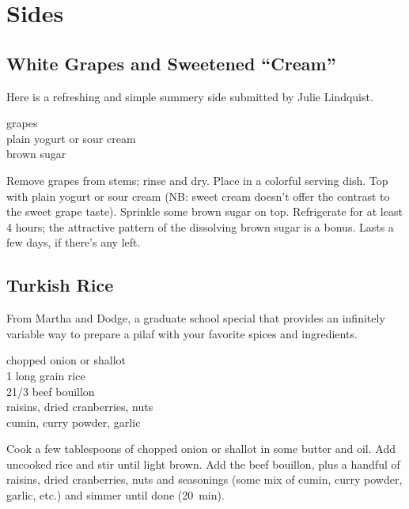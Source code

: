 \chapter{Sides}

\section{White Grapes and Sweetened ``Cream''}

\begin{open}
Here is a refreshing and simple summery side submitted by Julie Lindquist.
\end{open}
\begin{ingredients}
    grapes\\
    plain yogurt or sour cream\\
    brown sugar
\end{ingredients}
Remove grapes from stems; rinse and dry. Place in a colorful serving dish. Top
with plain yogurt or sour cream (NB: sweet cream doesn't offer the contrast to
the sweet grape taste). Sprinkle some brown sugar on top. Refrigerate for at
least 4 hours; the attractive pattern of the dissolving brown sugar is a
bonus. Lasts a few days, if there’s any left.

\section{Turkish Rice}

\begin{open}
    From Martha and Dodge, a graduate school special that provides an infinitely
    variable way to prepare a pilaf with your favorite spices and ingredients.
\end{open}
\begin{ingredients}
    chopped onion or shallot\\
    \SI{1}{\cup} long grain rice\\
    2\SI{1/3}{\cup} beef bouillon\\
    raisins, dried cranberries, nuts\\
    cumin, curry powder, garlic
\end{ingredients}
Cook a few tablespoons of chopped onion or shallot in some butter and oil. Add
uncooked rice and stir until light brown. Add the beef bouillon, plus a handful
of raisins, dried cranberries, nuts and seasonings (some mix of cumin, curry
powder, garlic, etc.) and simmer until done (\SI{20}{\minute}).


